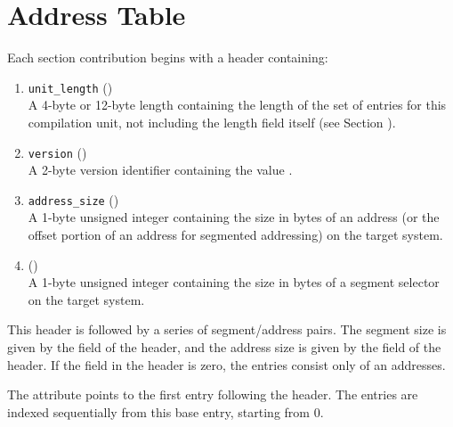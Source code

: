 \section{Address Table}
\label{chap:addresstable}
Each 
\bb
\dotdebugaddr{} section contribution
\eb
begins with a header containing:
\begin{enumerate}[1. ]
\item \texttt{unit\_length} () \\
A 4-byte or 12-byte length containing the length of
the set of entries for this compilation unit, not
including the length field itself
\bb
(see Section ).
\eb

\item  \texttt{version} (\HFTuhalf) \\
A 2-byte version identifier containing the value
\versiondotdebugaddr{}.

\item	\texttt{address\_size} (\HFTubyte) \\
A 1-byte unsigned integer containing the size in
bytes of an address (or the offset portion of an
address for segmented addressing) on the target
system.

\item	\HFNsegmentselectorsize{} (\HFTubyte) \\
A 1-byte unsigned integer containing the size in
bytes of a segment selector on the target system.
\end{enumerate}

This header is followed by a series of segment/address pairs.
The segment size is given by the \HFNsegmentselectorsize{} field of the
header, and the address size is given by the 
field of the header. If the \HFNsegmentselectorsize{} field in the header
is zero, the entries consist only of an addresses.

The \DWATaddrbase{} attribute points to the first entry
following the header. The entries are indexed sequentially
from this base entry, starting from 0.

